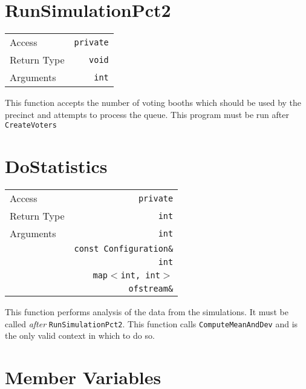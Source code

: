 \section{RunSimulationPct2}

\begin{center}
\begin{tabular}{l r}
Access & \texttt{private} \\
Return Type & \texttt{void} \\
Arguments & \texttt{int}
\end{tabular}
\end{center}

This function accepts the number of voting booths which should be used by the precinct and attempts to process the queue. This program must be run after \texttt{CreateVoters}

\section{DoStatistics}

\begin{center}
\begin{tabular}{l r}
Access & \texttt{private} \\
Return Type & \texttt{int} \\ \hline
Arguments & \texttt{int}\\
          & \texttt{const Configuration\&}\\
          & \texttt{int}\\
          & \texttt{map$<$int, int$>$}\\
          & \texttt{ofstream\&}
\end{tabular}
\end{center}

This function performs analysis of the data from the simulations. It must be called \emph{after} \texttt{RunSimulationPct2}. This function calls \texttt{ComputeMeanAndDev} and is the only valid context in which to do so.

\iffalse %
\section{Member Variables}

